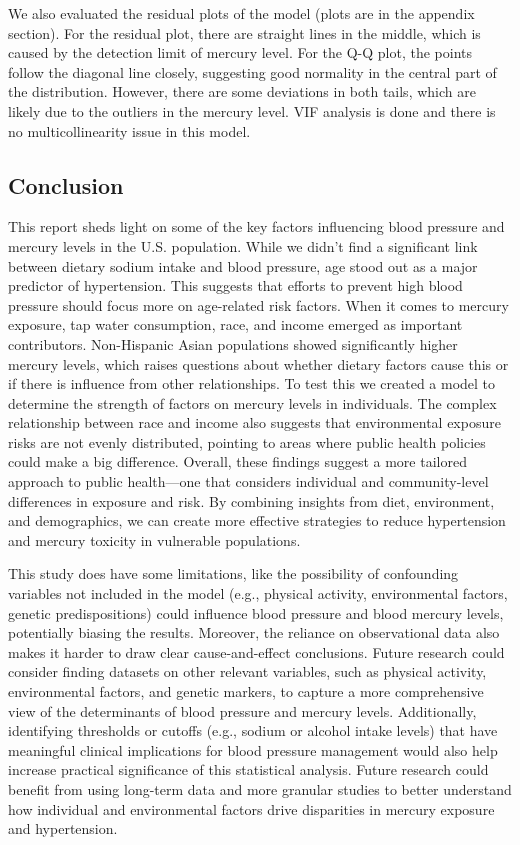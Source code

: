 \documentclass[
  letterpaper,
  DIV=11,
  numbers=noendperiod]{scrartcl}
\begin{document}
We also evaluated the residual plots of the model (plots are in the
appendix section). For the residual plot, there are straight lines in
the middle, which is caused by the detection limit of mercury level. For
the Q-Q plot, the points follow the diagonal line closely, suggesting
good normality in the central part of the distribution. However, there
are some deviations in both tails, which are likely due to the outliers
in the mercury level. VIF analysis is done and there is no
multicollinearity issue in this model.

\subsection{Conclusion}\label{conclusion}

This report sheds light on some of the key factors influencing blood
pressure and mercury levels in the U.S. population. While we didn't find
a significant link between dietary sodium intake and blood pressure, age
stood out as a major predictor of hypertension. This suggests that
efforts to prevent high blood pressure should focus more on age-related
risk factors. When it comes to mercury exposure, tap water consumption,
race, and income emerged as important contributors. Non-Hispanic Asian
populations showed significantly higher mercury levels, which raises
questions about whether dietary factors cause this or if there is
influence from other relationships. To test this we created a model to
determine the strength of factors on mercury levels in individuals. The
complex relationship between race and income also suggests that
environmental exposure risks are not evenly distributed, pointing to
areas where public health policies could make a big difference. Overall,
these findings suggest a more tailored approach to public health---one
that considers individual and community-level differences in exposure
and risk. By combining insights from diet, environment, and
demographics, we can create more effective strategies to reduce
hypertension and mercury toxicity in vulnerable populations.

This study does have some limitations, like the possibility of
confounding variables not included in the model (e.g., physical
activity, environmental factors, genetic predispositions) could
influence blood pressure and blood mercury levels, potentially biasing
the results. Moreover, the reliance on observational data also makes it
harder to draw clear cause-and-effect conclusions. Future research could
consider finding datasets on other relevant variables, such as physical
activity, environmental factors, and genetic markers, to capture a more
comprehensive view of the determinants of blood pressure and mercury
levels. Additionally, identifying thresholds or cutoffs (e.g., sodium or
alcohol intake levels) that have meaningful clinical implications for
blood pressure management would also help increase practical
significance of this statistical analysis. Future research could benefit
from using long-term data and more granular studies to better understand
how individual and environmental factors drive disparities in mercury
exposure and hypertension.
\end{document}
